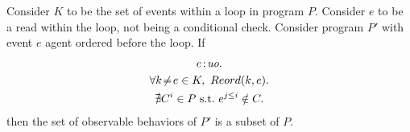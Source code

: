 \begin{corollary}
    \label{LoopInvCodeMotRead1}
    Consider $K$ to be the set of events within a loop in program $P$. 
    Consider $e$ to be a read within the loop, not being a conditional check. 
    Consider program $P'$ with event $e$ agent ordered before the loop. 
    If
    \begin{gather}
        e\!:\!\textit{uo}. \label{licmr1:eq1}\\
        \forall k\!\neq\!e \in K, \ Reord(k, e). \label{licmr1:eq2}\\ 
        \nexists C^i \in P \ \text{s.t.} \ e^{j \leq i} \notin C.  \label{licmr1:eq3}                    
    \end{gather}
    then the set of observable behaviors of $P'$ is a subset of $P$.
\end{corollary}


